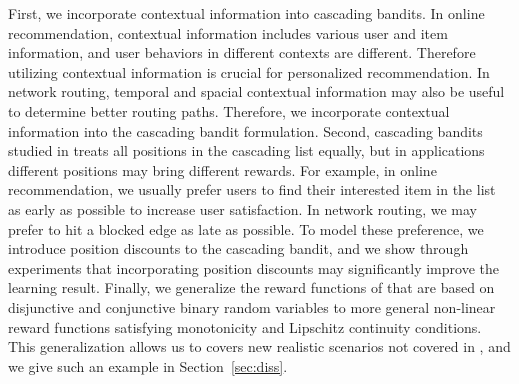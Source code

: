 \documentclass{article}
\begin{document}
First, we incorporate contextual information into cascading bandits.
In online recommendation, contextual information includes various user and item information, 
	and user behaviors in different contexts are different.
Therefore utilizing contextual information is crucial for personalized recommendation.
In network routing, temporal and spacial contextual information may also be useful to
	determine better routing paths.
Therefore, we incorporate contextual information into the cascading bandit formulation.
Second, cascading bandits studied in \cite{kveton2015cascading,kveton2015combinatorial}
	treats all positions in the cascading list equally, but in applications different positions
	may bring different rewards.
For example, in online recommendation, we usually prefer users to find their interested item
	in the list as early as possible to increase user satisfaction.
In network routing, we may prefer to hit a blocked edge as late as possible.
To model these preference, we introduce position discounts to the cascading bandit, and
	we show through experiments that incorporating position discounts may significantly
	improve the learning result.
Finally, we generalize the reward functions of \cite{kveton2015cascading,kveton2015combinatorial}
	that are based on disjunctive and conjunctive binary random variables to more general
	non-linear reward functions satisfying monotonicity and Lipschitz continuity conditions.
This generalization allows us to covers new realistic scenarios not covered in
	\cite{kveton2015cascading,kveton2015combinatorial}, and we give such an example
	in Section~\ref{sec:diss}.


\end{document}
